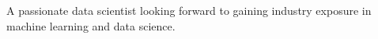 

\begin{cvparagraph}

A passionate data scientist looking forward to gaining industry exposure in machine learning and data science.
\end{cvparagraph}

